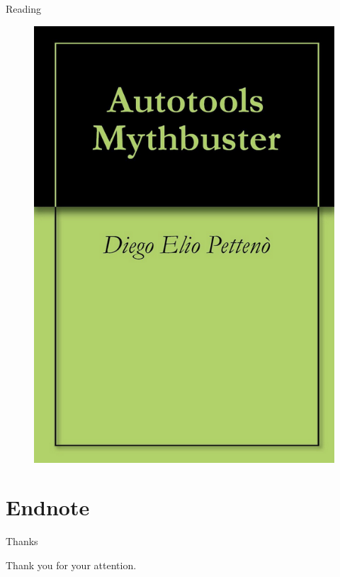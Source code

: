 \documentclass{beamer}
\begin{document}
\begin{frame}{Reading}
	\begin{figure}
	\includegraphics[width= 0.4\linewidth]{mythbuster.png}
	\end{figure}
\end{frame}

\section{Endnote}

\begin{frame}{Thanks}
	\begin{center}
	Thank you for your attention.
	\end{center}
\end{frame}
\end{document}
